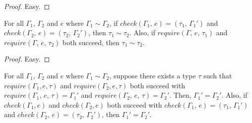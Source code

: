 \documentclass[peerreview, 10pt]{IEEEtran}
\newcommand{\checktype}[4]{\ensuremath{{check}(#1,\,#2)=(#3,\,#4)}}
\newcommand{\requiretype}[4]{\ensuremath{{require}(#1,\,#2,\,#3)=#4}}
\begin{document}
\begin{proof}
    Easy.
\end{proof}

\begin{lemma}
    \label{lem:same-kind}
    For all $\Gamma_1$, $\Gamma_2$ and $e$ where $\Gamma_1\sim\Gamma_2$, if $\checktype{\Gamma_1}{e}{\tau_1}{\Gamma_1'}$ and $\checktype{\Gamma_2}{e}{\tau_2}{\Gamma_2'}$, then $\tau_1\sim\tau_2$. Also, if $require(\Gamma,\,e,\,\tau_1)$ and $require(\Gamma,\,e,\,\tau_2)$ both succeed, then $\tau_1\sim\tau_2$.
\end{lemma}

\begin{proof}

Easy.
\end{proof}


\begin{theorem}
    \label{thm:assoc-iden}
    For all $\Gamma_1$, $\Gamma_2$ and $e$ where $\Gamma_1\sim\Gamma_2$, suppose there exists a type $\tau$ such that $require(\Gamma_1, e, \tau)$ and $require(\Gamma_2, e, \tau)$ both succeed with $\requiretype{\Gamma_1}{e}{\tau}{\Gamma_1'}$ and $\requiretype{\Gamma_2}{e}{\tau}{\Gamma_2'}$. Then, $\Gamma_1'=\Gamma_2'$. Also, if $check(\Gamma_1, e)$ and $check(\Gamma_2, e)$ both succeed with $\checktype{\Gamma_1}{e}{\tau_1}{\Gamma_1'}$ and $\checktype{\Gamma_2}{e}{\tau_2}{\Gamma_2'}$, then $\Gamma_1'=\Gamma_2'$.
\end{theorem}
\end{document}
